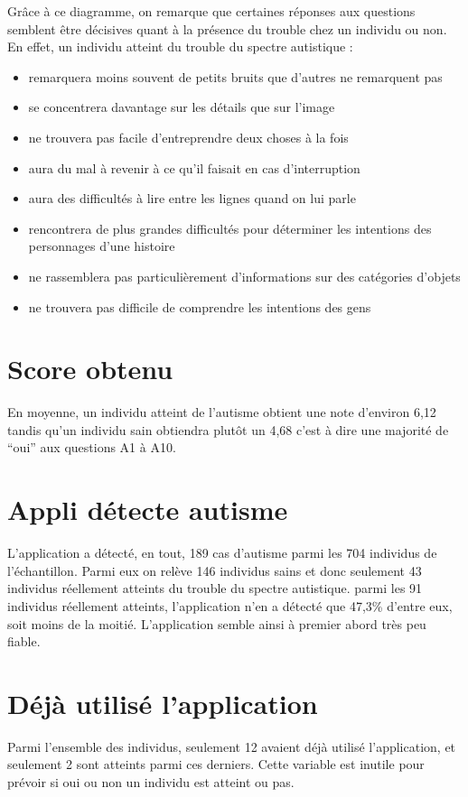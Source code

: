 \documentclass[12,french]{report}
\begin{document}
	Grâce à ce diagramme, on remarque que certaines réponses aux questions semblent être décisives quant à la présence du trouble chez un individu ou non. En effet, un individu atteint du trouble du spectre autistique :

\begin{itemize}
	\item remarquera moins souvent de petits bruits que d’autres ne remarquent pas
	\item se concentrera davantage sur les détails que sur l’image
	\item ne trouvera pas facile d’entreprendre deux choses à la fois
	\item aura du mal à revenir à ce qu’il faisait en cas d’interruption
	\item aura des difficultés à lire entre les lignes quand on lui parle
	\item rencontrera de plus grandes difficultés pour déterminer les intentions  des personnages d’une histoire
	\item ne rassemblera pas particulièrement d’informations sur des catégories d’objets
	\item ne trouvera pas difficile de comprendre les intentions des gens
\end{itemize}

\section{Score obtenu}
	En moyenne, un individu atteint de l’autisme obtient une note d’environ 6,12 tandis qu’un individu sain obtiendra plutôt un 4,68 c’est à dire une majorité de “oui” aux questions A1 à A10.
	
\section{Appli détecte autisme}
L’application a détecté, en tout, 189 cas d’autisme parmi les 704 individus de l’échantillon. Parmi eux on relève 146 individus sains et donc seulement 43 individus réellement atteints du trouble du spectre autistique. parmi les 91 individus réellement atteints, l’application n’en a détecté que 47,3\% d’entre eux, soit moins de la moitié. L’application semble ainsi à premier abord très peu fiable.


\section{Déjà utilisé l'application}
Parmi l’ensemble des individus, seulement 12 avaient déjà utilisé l’application, et seulement 2 sont atteints parmi ces derniers. Cette variable est inutile pour prévoir si oui ou non un individu est atteint ou pas.
\end{document}

